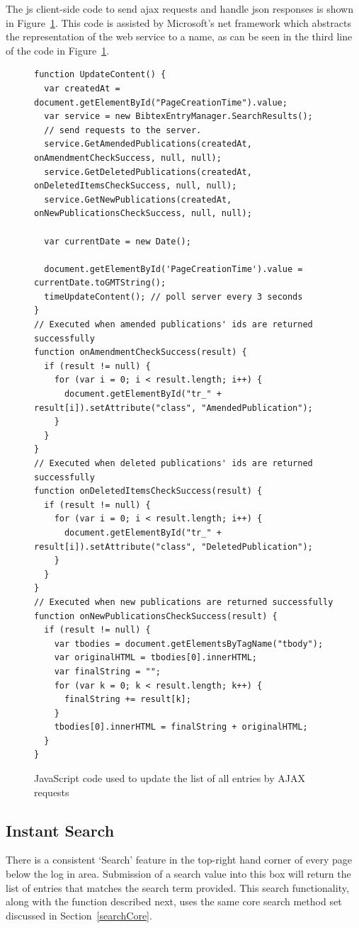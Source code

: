 The \gls{js} client-side code to send \gls{ajax} requests and handle \gls{json} responses is shown in Figure~\ref{fig:listAjaxUpdate}.  This code is assisted by Microsoft's \gls{net} framework which abstracts the representation of the web service to a name, as can be seen in the third line of the code in Figure~\ref{fig:listAjaxUpdate}.

\begin{figure}
	\begin{center}
			\lstset{language=JavaScript} 
			\begin{lstlisting}
function UpdateContent() {
  var createdAt = document.getElementById("PageCreationTime").value;
  var service = new BibtexEntryManager.SearchResults();
  // send requests to the server.  
  service.GetAmendedPublications(createdAt, onAmendmentCheckSuccess, null, null);
  service.GetDeletedPublications(createdAt, onDeletedItemsCheckSuccess, null, null);
  service.GetNewPublications(createdAt, onNewPublicationsCheckSuccess, null, null);

  var currentDate = new Date();

  document.getElementById('PageCreationTime').value = currentDate.toGMTString();
  timeUpdateContent(); // poll server every 3 seconds
}
// Executed when amended publications' ids are returned successfully
function onAmendmentCheckSuccess(result) {
  if (result != null) {
    for (var i = 0; i < result.length; i++) {
      document.getElementById("tr_" + result[i]).setAttribute("class", "AmendedPublication");
    }
  }
}
// Executed when deleted publications' ids are returned successfully
function onDeletedItemsCheckSuccess(result) {
  if (result != null) {
    for (var i = 0; i < result.length; i++) {
      document.getElementById("tr_" + result[i]).setAttribute("class", "DeletedPublication");
    }
  }
}
// Executed when new publications are returned successfully
function onNewPublicationsCheckSuccess(result) {
  if (result != null) {
    var tbodies = document.getElementsByTagName("tbody");
    var originalHTML = tbodies[0].innerHTML;
    var finalString = "";
    for (var k = 0; k < result.length; k++) {
      finalString += result[k];
    }
    tbodies[0].innerHTML = finalString + originalHTML;
  }
}
			\end{lstlisting}
		\caption{JavaScript code used to update the list of all entries by AJAX requests}
		\label{fig:listAjaxUpdate}
	\end{center}
\end{figure}

\subsection{Instant Search}
There is a consistent `Search' feature in the top-right hand corner of every page below the log in area.  Submission of a search value into this box will return the list of entries that matches the search term provided.  This search functionality, along with the function described next, uses the same core search method set discussed in Section~\ref{searchCore}.

